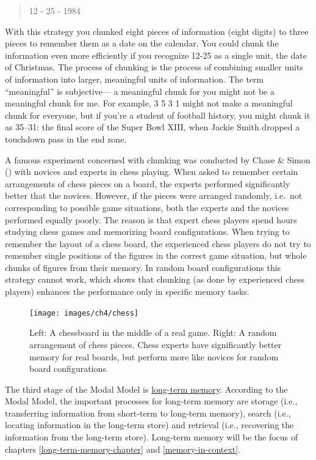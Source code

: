 \documentclass[
]{krantz}
\begin{document}
\begin{quote}
12 - 25 - 1984
\end{quote}

With this strategy you chunked eight pieces of information (eight digits) to three pieces to remember them as a date on the calendar. You could chunk the information even more efficiently if you recognize 12-25 as a single unit, the date of Christmas. The process of chunking is the process of combining smaller units of information into larger, meaningful units of information. The term ``meaningful'' is subjective--- a meaningful chunk for you might not be a meaningful chunk for me. For example, 3 5 3 1 might not make a meaningful chunk for everyone, but if you're a student of football history, you might chunk it as 35--31: the final score of the Super Bowl XIII, when Jackie Smith dropped a touchdown pass in the end zone.

A famous experiment concerned with chunking was conducted by Chase \& Simon () with novices and experts in chess playing. When asked to remember certain arrangements of chess pieces on a board, the experts performed significantly better that the novices. However, if the pieces were arranged randomly, i.e.~not corresponding to possible game situations, both the experts and the novices performed equally poorly. The reason is that expert chess players spend hours studying chess games and memorizing board configurations. When trying to remember the layout of a chess board, the experienced chess players do not try to remember single positions of the figures in the correct game situation, but whole chunks of figures from their memory. In random board configurations this strategy cannot work, which shows that chunking (as done by experienced chess players) enhances the performance only in specific memory tasks.

\begin{figure}

{\centering \texttt{[image: images/ch4/chess]} 

}

\caption{Left: A chessboard in the middle of a real game. Right: A random arrangement of chess pieces. Chess experts have significantly better memory for real boards, but perform more like novices for random board configurations.}\label{fig:chess}
\end{figure}

The third stage of the Modal Model is \hyperref[long-term-memory]{long-term memory}. According to the Modal Model, the important processes for long-term memory are storage (i.e., transferring information from short-term to long-term memory), search (i.e., locating information in the long-term store) and retrieval (i.e., recovering the information from the long-term store). Long-term memory will be the focus of chapters \ref{long-term-memory-chapter} and \ref{memory-in-context}.
\end{document}
